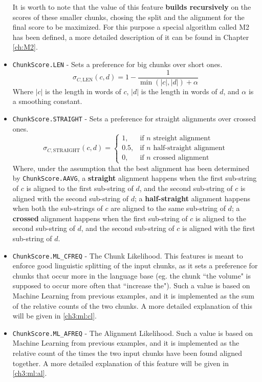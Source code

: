 \begin{itemize}
	It is worth to note that the value of this feature \textbf{builds recursively} on the scores of these smaller chunks, chosing the split and the alignment for the final score to be maximized. For this purpose a special algorithm called M2 has been defined, a more detailed description of it can be found in Chapter \ref{ch:M2}.
	
	\item \texttt{ChunkScore.LEN} - Sets a preference for big chunks over short ones.
	\begin{displaymath}
		\sigma_{C,\text{LEN}}(c,d) = 1-\frac{1}{\min(|c|,|d|)+\alpha}
	\end{displaymath}
	Where $|c|$ is the length in words of $c$, $|d|$ is the length in words of $d$, and $\alpha$ is a smoothing constant.
	
	\item \texttt{ChunkScore.STRAIGHT} - Sets a preference for straight alignments over crossed ones.
	\begin{displaymath}
		\sigma_{C,\text{STRAIGHT}}(c,d) = \begin{cases} 1, & \mbox{if } n\mbox{ streight alignment} \\
		                                                0.5, & \mbox{if } n\mbox{ half-straight alignment} \\
		                                                0, & \mbox{if } n\mbox{ crossed alignment} \end{cases}
	\end{displaymath}
	Where, under the assumption that the best alignment has been determined by \texttt{ChunkScore.AAVG}, a \textbf{straight} alignment happens when the first sub-string of $c$ is aligned to the first sub-string of $d$, and the second sub-string of $c$ is aligned with the second sub-string of $d$; a \textbf{half-straight} alignment happens when both the sub-strings of $c$ are aligned to the same sub-string of $d$; a \textbf{crossed} alignment happens when the first sub-string of $c$ is aligned to the second sub-string of $d$, and the second sub-string of $c$ is aligned with the first sub-string of $d$.

	\item \texttt{ChunkScore.ML\_CFREQ} - The Chunk Likelihood. This features is meant to enforce good linguistic splitting of the input chunks, as it sets a preference for chunks that occur more in the language base (eg. the chunk ``the volume" is supposed to occur more often that ``increase the"). Such a value is based on Machine Learning from previous examples, and it is implemented as the sum of the relative counts of the two chunks. A more detailed explanation of this will be given in \ref{ch3:ml:cl}.

	\item \texttt{ChunkScore.ML\_AFREQ} - The Alignment Likelihood. Such a value is based on Machine Learning from previous examples, and it is implemented as the relative count of the times the two input chunks have been found aligned together. A more detailed explanation of this feature will be given in  \ref{ch3:ml:al}. 
	
	
\end{itemize}

